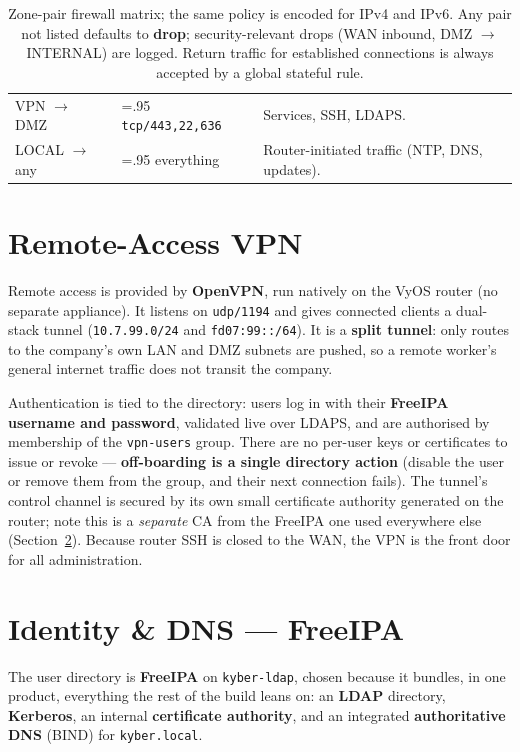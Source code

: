 \documentclass[11pt,a4paper]{article}
\newcommand{\code}[1]{\texttt{#1}}
\begin{document}
\begin{table}[H]
\begin{tabularx}{\linewidth}{@{}l >{\hsize=.95\hsize}X >{\hsize=1.05\hsize}X@{}}
VPN $\rightarrow$ DMZ        & \code{tcp/443,22,636}                     & Services, SSH, LDAPS. \\
LOCAL $\rightarrow$ any      & everything                                & Router-initiated traffic (NTP, DNS, updates). \\
\bottomrule
\end{tabularx}
\caption{Zone-pair firewall matrix; the same policy is encoded for IPv4 and IPv6. Any pair
         not listed defaults to \textbf{drop}; security-relevant drops (WAN inbound,
         DMZ $\rightarrow$ INTERNAL) are logged. Return traffic for established connections is
         always accepted by a global stateful rule.}
\label{tab:fw}
\end{table}

\section{Remote-Access VPN}
\label{sec:vpn}

Remote access is provided by \textbf{OpenVPN}, run natively on the VyOS router (no separate
appliance). It listens on \code{udp/1194} and gives connected clients a dual-stack tunnel
(\code{10.7.99.0/24} and \code{fd07:99::/64}). It is a \textbf{split tunnel}: only routes to
the company's own LAN and DMZ subnets are pushed, so a remote worker's general internet
traffic does not transit the company.

Authentication is tied to the directory: users log in with their \textbf{FreeIPA username
and password}, validated live over LDAPS, and are authorised by membership of the
\code{vpn-users} group. There are no per-user keys or certificates to issue or revoke ---
\textbf{off-boarding is a single directory action} (disable the user or remove them from
the group, and their next connection fails). The tunnel's control channel is secured by its
own small certificate authority generated on the router; note this is a \emph{separate} CA
from the FreeIPA one used everywhere else (Section~\ref{sec:idm}). Because router SSH is
closed to the WAN, the VPN is the front door for all administration.

\section{Identity \& DNS --- FreeIPA}
\label{sec:idm}

The user directory is \textbf{FreeIPA} on \code{kyber-ldap}, chosen because it bundles, in
one product, everything the rest of the build leans on: an \textbf{LDAP} directory,
\textbf{Kerberos}, an internal \textbf{certificate authority}, and an integrated
\textbf{authoritative DNS} (BIND) for \code{kyber.local}.
\end{document}
